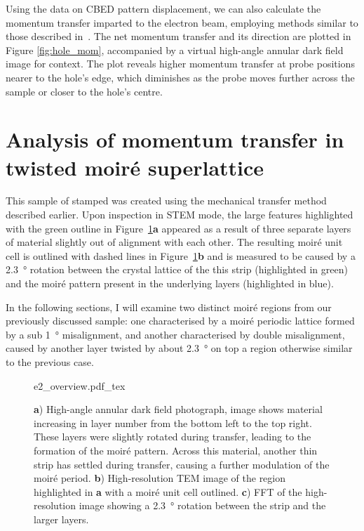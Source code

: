 Using the data on CBED pattern displacement, we can also calculate the momentum transfer imparted to the electron beam, employing methods similar to those described in~\cite{mullerAtomicElectricFields2014}. 
%
The net momentum transfer and its direction are plotted in Figure \ref{fig:hole_mom}, accompanied by a virtual high-angle annular dark field image for context. 
%
The plot reveals higher momentum transfer at probe positions nearer to the hole's edge, which diminishes as the probe moves further across the sample or closer to the hole's centre.
%


\section{Analysis of momentum transfer in twisted  moiré superlattice}
%
This sample of stamped  was created using the mechanical transfer method described earlier. Upon inspection in STEM mode, the large features highlighted with the green outline in Figure~\ref{fig:dub_moire}\textbf{a} appeared as a result of three separate layers of material slightly out of alignment with each other. 
%
The resulting moiré unit cell is outlined with dashed lines in Figure~\ref{fig:dub_moire}\textbf{b} and is measured to be caused by a \SI{2.3}{\degree} rotation between the crystal lattice of the this strip (highlighted in green) and the moiré pattern present in the underlying layers (highlighted in blue).

In the following sections, I will examine two distinct moiré regions from our previously discussed sample: one characterised by a moiré periodic lattice formed by a sub \SI{1}{\degree} misalignment, and another characterised by double misalignment, caused by another layer twisted by about \SI{2.3}{\degree} on top a region otherwise similar to the previous case.
\begin{figure}[h]
    \centering
    \def\svgwidth{.95\linewidth}
    {e2_overview.pdf_tex}
    \caption{\textbf{a}) High-angle annular dark field photograph, image shows material increasing in layer number from the bottom left to the top right. These layers were slightly rotated during transfer, leading to the formation of the moiré pattern. Across this material, another thin strip has settled during transfer, causing a further modulation of the moiré period. \textbf{b}) High-resolution TEM image of the region highlighted in \textbf{a} with a moiré unit cell outlined. \textbf{c}) FFT of the high-resolution image showing a \SI{2.3}{\degree} rotation between the strip and the larger layers.}
    \label{fig:dub_moire}
\end{figure}

